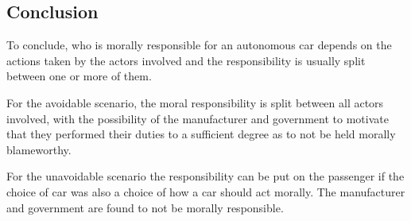 \subsection{Conclusion}
To conclude, who is morally responsible for an autonomous car depends on the
actions taken by the actors involved and the responsibility is usually split
between one or more of them.

For the avoidable scenario, the moral responsibility is split between all actors
involved, with the possibility of the manufacturer and government to motivate
that they performed their duties to a sufficient degree as to not be held
morally blameworthy.

For the unavoidable scenario the responsibility can be put on the passenger if
the choice of car was also a choice of how a car should act morally. The
manufacturer and government are found to not be morally responsible.